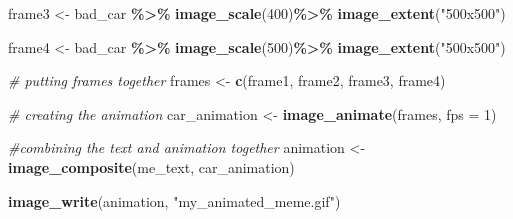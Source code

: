 \documentclass[
]{article}
\newenvironment{Shaded}{\begin{snugshade}}{\end{snugshade}}
\newcommand{\AttributeTok}[1]{\textcolor[rgb]{0.13,0.29,0.53}{#1}}
\newcommand{\CommentTok}[1]{\textcolor[rgb]{0.56,0.35,0.01}{\textit{#1}}}
\newcommand{\DecValTok}[1]{\textcolor[rgb]{0.00,0.00,0.81}{#1}}
\newcommand{\FunctionTok}[1]{\textcolor[rgb]{0.13,0.29,0.53}{\textbf{#1}}}
\newcommand{\NormalTok}[1]{#1}
\newcommand{\OtherTok}[1]{\textcolor[rgb]{0.56,0.35,0.01}{#1}}
\newcommand{\SpecialCharTok}[1]{\textcolor[rgb]{0.81,0.36,0.00}{\textbf{#1}}}
\newcommand{\StringTok}[1]{\textcolor[rgb]{0.31,0.60,0.02}{#1}}
\begin{document}
\begin{Shaded}
\begin{Highlighting}[]
\NormalTok{frame3 }\OtherTok{\textless{}{-}}\NormalTok{ bad\_car }\SpecialCharTok{\%\textgreater{}\%}
  \FunctionTok{image\_scale}\NormalTok{(}\DecValTok{400}\NormalTok{)}\SpecialCharTok{\%\textgreater{}\%}
  \FunctionTok{image\_extent}\NormalTok{(}\StringTok{"500x500"}\NormalTok{)}

\NormalTok{frame4 }\OtherTok{\textless{}{-}}\NormalTok{ bad\_car }\SpecialCharTok{\%\textgreater{}\%}
  \FunctionTok{image\_scale}\NormalTok{(}\DecValTok{500}\NormalTok{)}\SpecialCharTok{\%\textgreater{}\%}
  \FunctionTok{image\_extent}\NormalTok{(}\StringTok{"500x500"}\NormalTok{)}

\CommentTok{\# putting frames together}
\NormalTok{frames }\OtherTok{\textless{}{-}} \FunctionTok{c}\NormalTok{(frame1, frame2, frame3, frame4)}

\CommentTok{\# creating the animation}
\NormalTok{car\_animation }\OtherTok{\textless{}{-}} \FunctionTok{image\_animate}\NormalTok{(frames, }\AttributeTok{fps =} \DecValTok{1}\NormalTok{)}

\CommentTok{\#combining the text and animation together}
\NormalTok{animation }\OtherTok{\textless{}{-}} \FunctionTok{image\_composite}\NormalTok{(me\_text, car\_animation)}

\FunctionTok{image\_write}\NormalTok{(animation, }\StringTok{"my\_animated\_meme.gif"}\NormalTok{)}
\end{Highlighting}
\end{Shaded}
\end{document}
